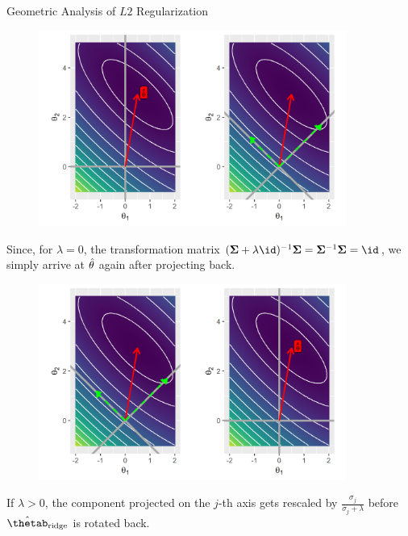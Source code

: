 \documentclass[11pt,compress,t,notes=noshow, xcolor=table]{beamer}
\begin{document}
\begin{vbframe}{Geometric Analysis of $L2$ Regularization}
\begin{figure}
\includegraphics[width=0.9\textwidth]{figure/l2_reg_hess_01_plot.png}\\
\end{figure}

\framebreak

Since, for $\lambda = 0$, the transformation matrix $(\bm{\Sigma} + \lambda \id)^{-1} \bm{\Sigma} = \bm{\Sigma}^{-1} \bm{\Sigma} = \id$, we simply arrive at $\hat{\theta}$ again after projecting back.

\begin{figure}
\includegraphics[width=0.9\textwidth]{figure/l2_reg_hess_02_plot.png}\\
\end{figure}


\framebreak
  
If $\lambda > 0$, the component projected on the $j$-th axis gets rescaled by $\frac{\sigma_j}{\sigma_j + \lambda}$ before $\hat{\thetab}_{\text{ridge}}$ is rotated back.


\end{vbframe}
\end{document}

